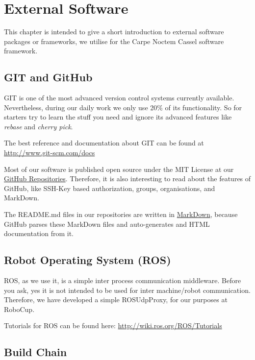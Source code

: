 \chapter{External Software}
\label{chap:ExtSoftware}

This chapter is intended to give a short introduction to external software packages or frameworks, we utilise for the Carpe Noctem Cassel software framework.

\section{GIT and GitHub}
\label{sec:Git}

GIT is one of the most advanced version control systems currently available. Nevertheless, during our daily work we only use 20\% of its functionality. So for starters try to learn the stuff you need and ignore its advanced features like \emph{rebase} and \emph{cherry pick}.

The best reference and documentation about GIT can be found at \url{http://www.git-scm.com/docs}

Most of our software is published open source under the MIT License at our \href{https://github.com/carpe-noctem-cassel}{GitHub Repositories}. Therefore, it is also interesting to read about the features of GitHub, like SSH-Key based authorization, groups, organisations, and MarkDown.

The README.md files in our repositories are written in \href{https://en.wikipedia.org/wiki/Markdown}{MarkDown}, because GitHub parses these MarkDown files and auto-generates and HTML documentation from it.

\section{Robot Operating System (ROS)}
\label{sec:ROS}

ROS, as we use it, is a simple inter process communication middleware. Before you ask, yes it is not intended to be used for inter machine/robot communication. Therefore, we have developed a simple ROSUdpProxy, for our purposes at RoboCup. 

Tutorials for ROS can be found here: \url{http://wiki.ros.org/ROS/Tutorials}

\section{Build Chain}
\label{sec:BuildChain}

